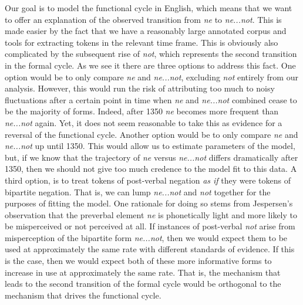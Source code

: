 \documentclass[linguex]{sp}
\theoremstyle{definition} \newtheorem{definition}{Definition}
\begin{document}
Our goal is to model the functional cycle in English, which means that we want to offer an explanation of the observed transition from \textit{\color{red} ne} to \textit{\color{blue} ne...not}. This is made easier by the fact that we have a reasonably large annotated corpus and tools for extracting tokens in the relevant time frame. This is obviously also complicated by the subsequent rise of \textit{\color{green} not}, which represents the second transition in the formal cycle.  As we see it there are three options to address this fact. One option would be to only compare \textit{\color{red} ne} and \textit{\color{blue} ne...not}, excluding \textit{\color{green} not} entirely from our analysis. However, this would run the risk of attributing too much to noisy fluctuations after a certain point in time when \textit{\color{red} ne} and \textit{\color{blue} ne...not} combined cease to be the majority of forms. Indeed, after 1350 \textit{\color{red} ne} becomes more frequent than \textit{\color{blue} ne...not} again. Yet, it does not seem reasonable to take this as evidence for a reversal of the functional cycle.   Another option would be to only compare \textit{\color{red} ne} and \textit{\color{blue} ne...not} up until 1350. This would allow us to estimate parameters of the model, but, if we know that the trajectory of \textit{\color{red} ne} versus \textit{\color{blue} ne...not} differs dramatically after 1350, then we should not give too much credence to the model fit to this data. A third option, is to treat tokens of post-verbal negation \emph{as if} they were tokens of bipartite negation. That is, we can lump \textit{\color{blue} ne...not} and \textit{\color{green} not} together for the purposes of fitting the model. One rationale for doing so stems from Jespersen's \citeyearpar{jespersen:1917} observation that the preverbal element \emph{ne} is phonetically light and more likely to be misperceived or not perceived at all. If instances of post-verbal \textit{\color{green} not}  arise from misperception of the bipartite form \textit{\color{blue} ne...not}, then we would expect them to be used at approximately the same rate with different standards of evidence.  If this is the case, then we would expect both of these more informative forms to increase in use at approximately the same rate.  That is, the mechanism that leads to the second transition of the formal cycle would be orthogonal to the mechanism that drives the functional cycle. 
\end{document}

